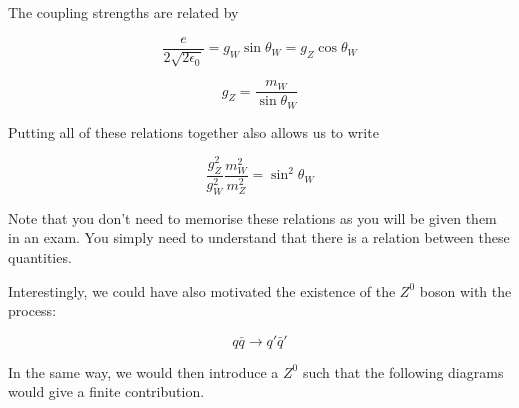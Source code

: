 The coupling strengths are related by

\[
\frac{e}{2\sqrt{2\epsilon_0}}=g_W\sin\theta_W=g_Z\cos\theta_W
\]


\[
g_Z = \frac{m_W}{\sin\theta_W}
\]

Putting all of these relations together also allows us to write

\[
\frac{g_{Z}^{2}}{g_{W}^{2}}\frac{m_{W}^{2}}{m_{Z}^{2}}=\sin^{2}\theta_W
\]

Note that you don't need to memorise these relations as you will be given them in an exam. You simply need to understand that there is a relation between these quantities.

Interestingly, we could have also motivated the existence of the $Z^0$ boson with the process: 

\[q\bar{q}\to q'\bar{q}'\]

In the same way, we would then introduce a $Z^0$ such that the following diagrams would give a finite contribution.

